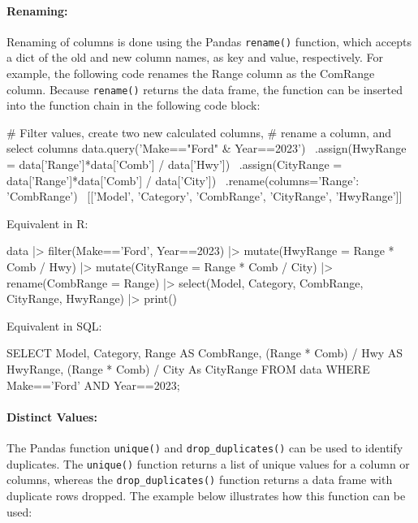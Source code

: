 \paragraph*{Renaming:} Renaming of columns is done using the Pandas \texttt{rename()} function, which accepts a dict of the old and new column names, as key and value, respectively. For example, the following code renames the Range column as the ComRange column. Because \texttt{rename()} returns the data frame, the function can be inserted into the function chain in the following code block:

\begin{samepage}
\begin{pythoncode}
# Filter values, create two new calculated columns,
# rename a column, and select columns
data.query('Make=="Ford" & Year==2023') \
    .assign(HwyRange = data['Range']*data['Comb'] / data['Hwy']) \
    .assign(CityRange = data['Range']*data['Comb'] / data['City']) \
    .rename(columns={'Range': 'CombRange'}) \
    [['Model', 'Category', 'CombRange', 'CityRange', 'HwyRange']]
\end{pythoncode}
\end{samepage}

\begin{multicols}{2}
Equivalent in R:

\begin{Rcode}
data |> 
  filter(Make=='Ford', 
         Year==2023) |> 
  mutate(HwyRange = 
     Range * Comb / Hwy) |>
  mutate(CityRange = 
     Range * Comb / City) |>
  rename(CombRange = Range) |>
  select(Model, Category, 
         CombRange, CityRange, 
         HwyRange) |>
  print()
\end{Rcode}

Equivalent in SQL:

\begin{sqlcode}
SELECT Model, Category, 
      Range AS CombRange,
      (Range * Comb) / Hwy 
          AS HwyRange, 
      (Range * Comb) / City 
          As CityRange
   FROM data 
   WHERE Make=='Ford' AND 
         Year==2023;
\end{sqlcode}
\end{multicols}

\paragraph*{Distinct Values:} The Pandas function \texttt{unique()} and \texttt{drop\_duplicates()} can be used to identify duplicates. The \texttt{unique()} function returns a list of unique values for a column or columns, whereas the \texttt{drop\_duplicates()} function returns a data frame with duplicate rows dropped. The example below illustrates how this function can be used:

